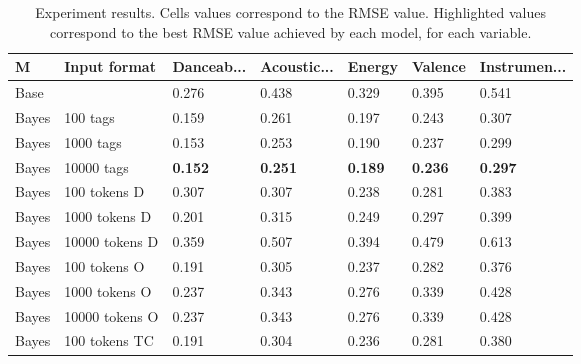 \documentclass[sn-mathphys]{sn-jnl}%
\theoremstyle{thmstyleone}%
\theoremstyle{thmstyletwo}%
\theoremstyle{thmstylethree}%
\begin{document}
\begin{table}[h!]
      \begin{center}
      \begin{minipage}{\textwidth}
      \caption{Experiment results. Cells values correspond to the RMSE value.
      Highlighted values correspond to the best RMSE value achieved by each model, for each variable.}
      \label{table:experiment_results}%
      \begin{tabular}{@{}lllllll@{}}
      \toprule
      M         & Input format                        & Danceab...       & Acoustic...    & Energy          & Valence         & Instrumen... \\
      \midrule
      Base      &                                     & 0.276            & 0.438           & 0.329          & 0.395           & 0.541          \\
      \midrule
      Bayes     & 100 tags\footnotemark[1]            & 0.159            & 0.261           & 0.197          & 0.243           & 0.307          \\
      Bayes     & 1000 tags                           & 0.153            & 0.253           & 0.190          & 0.237           & 0.299          \\
      Bayes     & 10000 tags                          &\textbf{0.152}    &\textbf{0.251}   &\textbf{0.189}  &\textbf{0.236}   &\textbf{0.297}  \\
      Bayes     & 100 tokens D\footnotemark[2]        & 0.307            & 0.307           & 0.238          & 0.281           & 0.383          \\
      Bayes     & 1000 tokens D                       & 0.201            & 0.315           & 0.249          & 0.297           & 0.399          \\
      Bayes     & 10000 tokens D                      & 0.359            & 0.507           & 0.394          & 0.479           & 0.613          \\
      Bayes     & 100 tokens O\footnotemark[3]        & 0.191            & 0.305           & 0.237          & 0.282           & 0.376          \\
      Bayes     & 1000 tokens O                       & 0.237            & 0.343           & 0.276          & 0.339           & 0.428          \\
      Bayes     & 10000 tokens O                      & 0.237            & 0.343           & 0.276          & 0.339           & 0.428          \\
      Bayes     & 100 tokens TC\footnotemark[4]       & 0.191            & 0.304           & 0.236          & 0.281           & 0.380          \\

\end{tabular}
\end{minipage}
\end{center}
\end{table}
\end{document}
